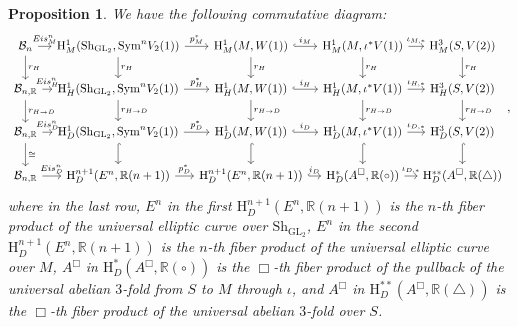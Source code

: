 \documentclass[11pt, a4paper]{amsart}
\theoremstyle{plain}
\newtheorem{proposition}[theorem]{Proposition}
\theoremstyle{definition}
\numberwithin{equation}{section}
\def\RR{\mathbb{R}}
\DeclareMathOperator{\GL}{\mathrm{GL}}
\newcommand{\Sh}{\mathrm{Sh}}
\begin{document}
\begin{proposition}
    We have the following commutative diagram: 
    \[
        \begin{tikzcd}[column sep = 0.8em]
            \mathcal{B}_n \ar[r,"Eis^n_M"] \ar[d, "r_{H}"] & \mathrm{H}^{1}_{M}(\Sh_{\GL_2}, \mathrm{Sym}^{n}V_2(1)) \ar[r, "p^{*}_{M}"] \ar[d, "r_{H}"] & \mathrm{H}^{1}_{M}(M, W(1)) \ar[r, hook, "i_{M}"] \ar[d, "r_{H}"] & \mathrm{H}^{1}_{M}(M, \iota^{*}V(1)) \ar[r, "\iota_{M, *}"] \ar[d, "r_{H}"] & \mathrm{H}^{3}_{M}(S,V(2)) \ar[d, "r_{H}"] \\
            \mathcal{B}_{n, \RR} \ar[r, "Eis^n_H"] \ar[d, "r_{H \rightarrow D}"] & \mathrm{H}^{1}_{H}(\Sh_{\GL_2}, \mathrm{Sym}^{n}V_2(1)) \ar[r,"p^{*}_{H}"] \ar[d, "r_{H \rightarrow D}"] & \mathrm{H}^{1}_{H}(M, W(1)) \ar[r, hook, "i_{H}"] \ar[d, "r_{H \rightarrow D}"] & \mathrm{H}^{1}_{H}(M, \iota^{*}V(1)) \ar[r, "\iota_{H, *}"]  \ar[d, "r_{H \rightarrow D}"] & \mathrm{H}^{3}_{H}(S,V(2)) \ar[d, "r_{H \rightarrow D}"] \\
            \mathcal{B}_{n, \RR} \ar[r, "Eis^n_D"] \ar[d, "\cong"] & \mathrm{H}^{1}_{D}(\Sh_{\GL_2}, \mathrm{Sym}^{n}V_2(1)) \ar[r, "p^{*}_{D}"] \ar[d, hook] & \mathrm{H}^{1}_{D}(M, W(1)) \ar[r, hook,"i_D"] \ar[d, hook] & \mathrm{H}^{1}_{D}(M, \iota^{*}V(1)) \ar[r, "\iota_{D, *}"] \ar[d, hook] & \mathrm{H}^{3}_{D}(S,V(2)) \ar[d, hook] \\
            \mathcal{B}_{n, \RR} \ar[r, "Eis^n_D"]  & \mathrm{H}^{n + 1}_{D}(E^{n}, \RR(n + 1)) \ar[r, "p^{*}_{D}"] & \mathrm{H}^{n + 1}_{D}(E^{n}, \RR(n + 1)) \ar[r, hook, "i_D"] & \mathrm{H}_{D}^{*}(A^{\Box}, \RR(\circ)) \ar[r, "\iota_{D, *}"] & \mathrm{H}_{D}^{**}(A^{\Box}, \RR(\triangle)) 
        \end{tikzcd}, 
    \]
    where in the last row, $E^{n}$ in the first $\mathrm{H}^{n + 1}_{D}(E^{n}, \RR(n + 1))$ is the $n$-th fiber product of the universal elliptic curve over $\Sh_{\GL_2}$, $E^{n}$ in the second $\mathrm{H}^{n + 1}_{D}(E^{n}, \RR(n + 1))$ is the $n$-th fiber product of the universal elliptic curve over $M$, $A^{\Box}$ in $\mathrm{H}_{D}^{*}(A^{\Box}, \RR(\circ))$ is the $\Box$-th fiber product of the pullback of the universal abelian $3$-fold from $S$ to $M$ through $\iota$, and $A^{\Box}$ in $\mathrm{H}_{D}^{**}(A^{\Box}, \RR(\triangle))$ is the $\Box$-th fiber product of the universal abelian $3$-fold over $S$. 
\end{proposition}
\end{document}
